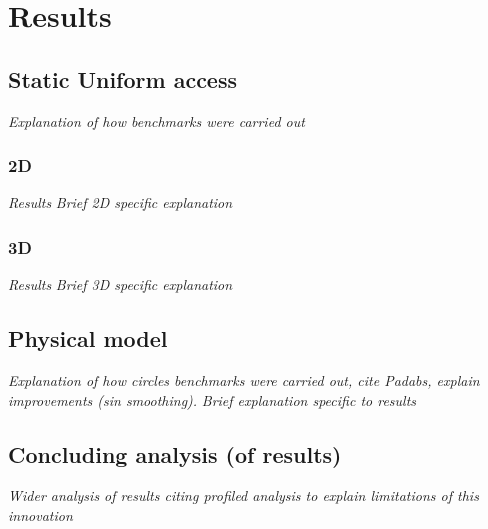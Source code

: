 \section{Results\label{sec:results}}

  \subsection{Static Uniform access}
    \textit{Explanation of how benchmarks were carried out}
  
    \subsubsection{2D}
      \textit{Results}
      \textit{Brief 2D specific explanation}

    \subsubsection{3D}
      \textit{Results}
      \textit{Brief 3D specific explanation}

  \subsection{Physical model}
    \textit{Explanation of how circles benchmarks were carried out, cite Padabs, explain improvements (sin smoothing).}
      \textit{Brief explanation specific to results}

  \subsection{Concluding analysis (of results)}
    \textit{Wider analysis of results citing profiled analysis to explain limitations of this innovation}

